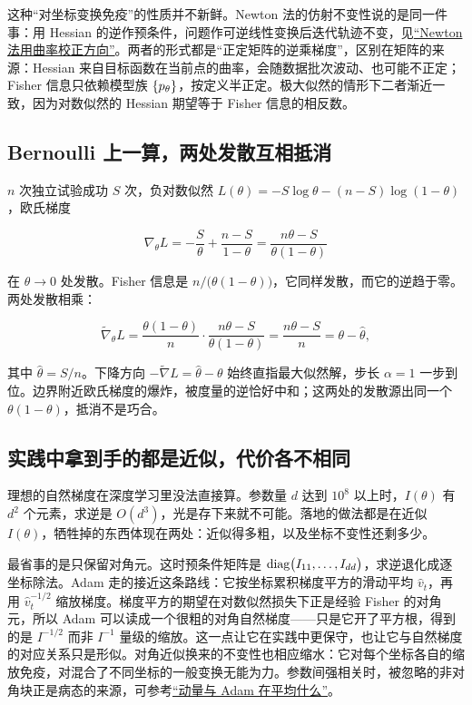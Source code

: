 这种``对坐标变换免疫''的性质并不新鲜。Newton 法的仿射不变性说的是同一件事：用 Hessian 的逆作预条件，问题作可逆线性变换后迭代轨迹不变，见\hyperref[sec:09-Convex-Optimization/06-Optimization-Algorithms/02]{``Newton 法用曲率校正方向''}。两者的形式都是``正定矩阵的逆乘梯度''，区别在矩阵的来源：Hessian 来自目标函数在当前点的曲率，会随数据批次波动、也可能不正定；Fisher 信息只依赖模型族 \(\left\{p_\theta\right\}\)，按定义半正定。极大似然的情形下二者渐近一致，因为对数似然的 Hessian 期望等于 Fisher 信息的相反数。

\subsection{Bernoulli 上一算，两处发散互相抵消}

\(n\) 次独立试验成功 \(S\) 次，负对数似然 \(L(\theta)=-S\log\theta-(n-S)\log(1-\theta)\)，欧氏梯度

\[
\nabla_\theta L=-\frac{S}{\theta}+\frac{n-S}{1-\theta}
=\frac{n\theta-S}{\theta(1-\theta)}
\]

在 \(\theta\to0\) 处发散。Fisher 信息是 \(n/\bigl(\theta(1-\theta)\bigr)\)，它同样发散，而它的逆趋于零。两处发散相乘：

\[
\widetilde\nabla_\theta L
=\frac{\theta(1-\theta)}{n}\cdot\frac{n\theta-S}{\theta(1-\theta)}
=\frac{n\theta-S}{n}
=\theta-\widehat\theta ,
\]

其中 \(\widehat\theta=S/n\)。下降方向 \(-\widetilde\nabla L=\widehat\theta-\theta\) 始终直指最大似然解，步长 \(\alpha=1\) 一步到位。边界附近欧氏梯度的爆炸，被度量的逆恰好中和；这两处的发散源出同一个 \(\theta(1-\theta)\)，抵消不是巧合。

\subsection{实践中拿到手的都是近似，代价各不相同}

理想的自然梯度在深度学习里没法直接算。参数量 \(d\) 达到 \(10^8\) 以上时，\(I(\theta)\) 有 \(d^2\) 个元素，求逆是 \(O(d^3)\)，光是存下来就不可能。落地的做法都是在近似 \(I(\theta)\)，牺牲掉的东西体现在两处：近似得多粗，以及坐标不变性还剩多少。

最省事的是只保留对角元。这时预条件矩阵是 \(\operatorname{diag}\bigl(I_{11},\dots,I_{dd}\bigr)\)，求逆退化成逐坐标除法。Adam 走的接近这条路线：它按坐标累积梯度平方的滑动平均 \(\hat v_t\)，再用 \(\hat v_t^{-1/2}\) 缩放梯度。梯度平方的期望在对数似然损失下正是经验 Fisher 的对角元，所以 Adam 可以读成一个很粗的对角自然梯度——只是它开了平方根，得到的是 \(I^{-1/2}\) 而非 \(I^{-1}\) 量级的缩放。这一点让它在实践中更保守，也让它与自然梯度的对应关系只是形似。对角近似换来的不变性也相应缩水：它对每个坐标各自的缩放免疫，对混合了不同坐标的一般变换无能为力。参数间强相关时，被忽略的非对角块正是病态的来源，可参考\hyperref[sec:14-Deep-Learning/03-Optimization-and-Training/02]{``动量与 Adam 在平均什么''}。


